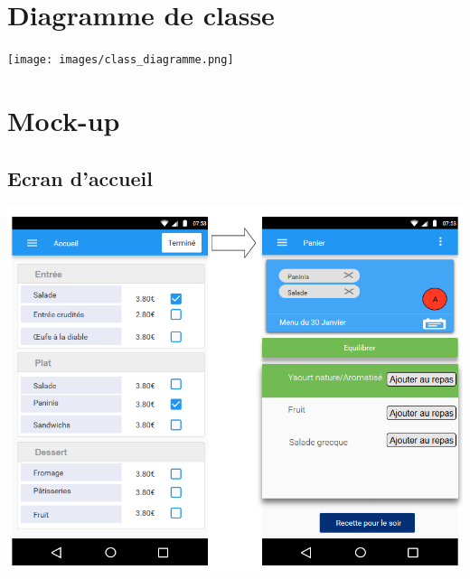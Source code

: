 \section{Diagramme de classe}

\texttt{[image: images/class\_diagramme.png]}

\section{Mock-up}

\subsection{Ecran d'accueil}

\includegraphics[width=14cm]{images/mockup_v2.png}



